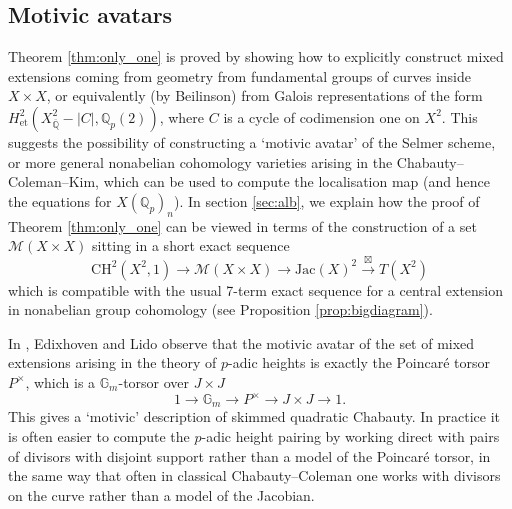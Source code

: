 \documentclass[11pt]{amsart}
\def\Q{\mathbb Q}
\theoremstyle{plain}
\theoremstyle{definition}
\newcommand{\Jac}{\mathrm{Jac}}
\newcommand{\CH}{\mathrm{CH}}
\newcommand{\et}{\mathrm{et}}
\begin{document}
\subsection{Motivic avatars}
Theorem \ref{thm:only_one} is proved by showing how to explicitly construct mixed extensions coming from geometry from fundamental groups of curves inside $X\times X$, or equivalently (by Beilinson) from Galois representations of the form $H^2 _{\et }(X^2 _{\overline{\Q }}-|C|,\Q _p (2))$, where $C$ is a cycle of codimension one on $X^2$. This suggests the possibility of constructing a `motivic avatar' of the Selmer scheme, or more general nonabelian cohomology varieties arising in the Chabauty--Coleman--Kim, which can be used to compute the localisation map (and hence the equations for $X(\Q _p )_n$). In section \ref{sec:alb}, we explain how the proof of Theorem \ref{thm:only_one} can be viewed in terms of the construction of a set $\mathcal{M}(X\times X)$ sitting in a short exact sequence
\[
\CH ^2 (X^2 ,1)\to \mathcal{M}(X\times X)\to \Jac (X)^2 \stackrel{\boxtimes }{\longrightarrow } T(X^2 )
\]
which is compatible with the usual 7-term exact sequence for a central extension in nonabelian group cohomology (see Proposition \ref{prop:bigdiagram}).

In \cite{EL23}, Edixhoven and Lido observe that the motivic avatar of the set of mixed extensions arising in the theory of $p$-adic heights is exactly the Poincar\'e torsor $P^\times $, which is a $\mathbb{G}_m $-torsor over $J\times J$
\begin{equation}\label{eqn:poincare}
1\to \mathbb{G}_m \to P^\times \to J\times J\to 1.
\end{equation}
This gives a `motivic' description of skimmed quadratic Chabauty. In practice it is often easier to compute the $p$-adic height pairing by working direct with pairs of divisors with disjoint support rather than a model of the Poincar\'e torsor, in the same way that often in classical Chabauty--Coleman one works with divisors on the curve rather than a model of the Jacobian. 
\end{document}
